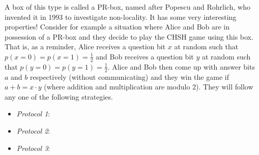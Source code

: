 \begin{exercises}
A box of this type is called a PR-box, named after Popescu and Rohrlich, who invented it in 1993 to investigate non-locality. It has some very interesting properties! Consider for example a situation where Alice and Bob are in possession of a PR-box and they decide to play the CHSH game using this box. That is, as a reminder, Alice receives a question bit \(x\) at random such that \(p(x=0) =p(x=1) = \frac{1}{2}\) and Bob receives a question bit \(y\) at random such that \(p(y=0) =p(y=1) = \frac{1}{2}\). Alice and Bob then come up with answer bits \(a\) and \(b\) respectively (without communicating) and they win the game if \(a+b = x\cdot y\) (where addition and multiplication are modulo 2). They will follow any one of the following strategies.
\begin{itemize}
\item \textit{Protocol 1}: 
\item \textit{Protocol 2}: 
\item \textit{Protocol 3}: 

\end{itemize}
\end{exercises}
